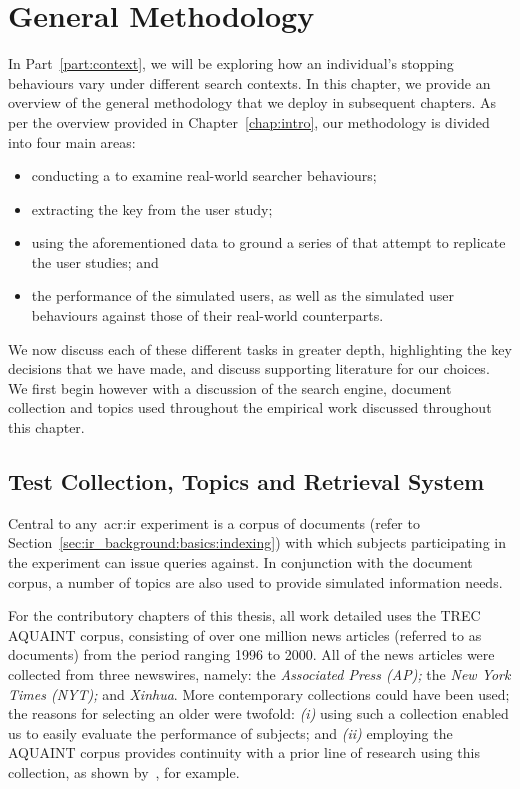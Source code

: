 
\chapter[General Methodology]{General Methodology}\label{chap:method}
In Part~\ref{part:context}, we will be exploring how an individual's stopping behaviours vary under different search contexts. In this chapter, we provide an overview of the general methodology that we deploy in subsequent chapters. As per the overview provided in Chapter~\ref{chap:intro}, our methodology is divided into four main areas:

\begin{itemize}
    \item{conducting a  to examine real-world searcher behaviours;}
    \item{extracting the key  from the user study;}
    \item{using the aforementioned data to ground a series of  that attempt to replicate the user studies; and}
    \item{ the performance of the simulated users, as well as  the simulated user behaviours against those of their real-world counterparts.}
\end{itemize}

We now discuss each of these different tasks in greater depth, highlighting the key decisions that we have made, and discuss supporting literature for our choices. We first begin however with a discussion of the search engine, document collection and topics used throughout the empirical work discussed throughout this chapter.

\section{Test Collection, Topics and Retrieval System}\label{sec:csm:methodology:collection}
Central to any~\gls{acr:ir} experiment is a corpus of documents (refer to Section~\ref{sec:ir_background:basics:indexing}) with which subjects participating in the experiment can issue queries against. In conjunction with the document corpus, a number of topics are also used to provide simulated information needs.

For the contributory chapters of this thesis, all work detailed uses the TREC AQUAINT corpus, consisting of over one million news articles (referred to as documents) from the period ranging 1996 to 2000. All of the news articles were collected from three newswires, namely: the \emph{Associated Press (AP);} the \emph{New York Times (NYT);} and \emph{Xinhua}. More contemporary collections could have been used; the reasons for selecting an older were twofold: \emph{(i)} using such a collection enabled us to easily evaluate the performance of subjects; and \emph{(ii)} employing the AQUAINT corpus provides continuity with a prior line of research using this collection, as shown by~\cite{azzopardi2013query_cost}, for example.

